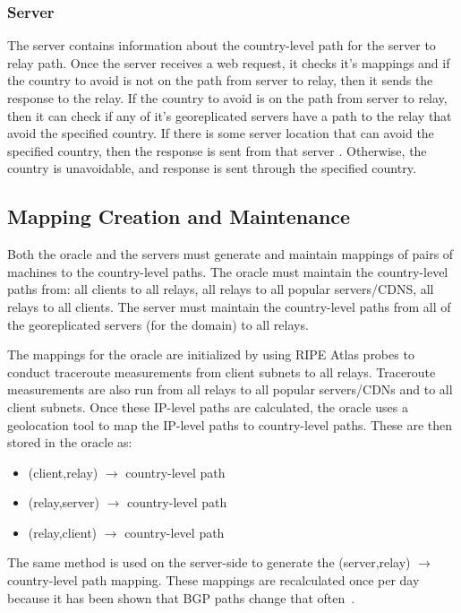 \subsubsection{Server}   The server contains information about the country-level path for the server to relay path.  Once the server receives a web request, it checks it's mappings and if the country to avoid is not on the path from server to relay, then it sends the response to the relay.  If the country to avoid is on the path from server to relay, then it can check if any of it's georeplicated servers have a path to the relay that avoid the specified country.  If there is some server location that can avoid the specified country, then the response is sent from that server .  Otherwise, the country is unavoidable, and response is sent through the specified country.

\subsection{Mapping Creation and Maintenance}
\label{maps}

Both the oracle and the servers must generate and maintain mappings of pairs of machines to the country-level paths.  The oracle must maintain the country-level paths from: all clients to all relays, all relays to all popular servers/CDNS, all relays to all clients.  The server must maintain the country-level paths from all of the georeplicated servers (for the domain) to all relays.  

The mappings for the oracle are initialized by using RIPE Atlas probes to conduct traceroute measurements from client subnets to all relays.  Traceroute measurements are also run from all relays to all popular servers/CDNs and to all client subnets.  Once these IP-level paths are calculated, the oracle uses a geolocation tool to map the IP-level paths to country-level paths.  These are then stored in the oracle as:

\begin{itemize}
\item (client,relay) $\rightarrow$ country-level path
\item (relay,server) $\rightarrow$ country-level path
\item (relay,client) $\rightarrow$ country-level path
\end{itemize}

The same method is used on the server-side to generate the (server,relay) $\rightarrow$ country-level path mapping.  These mappings are recalculated once per day because it has been shown that BGP paths change that often~\cite{}.
